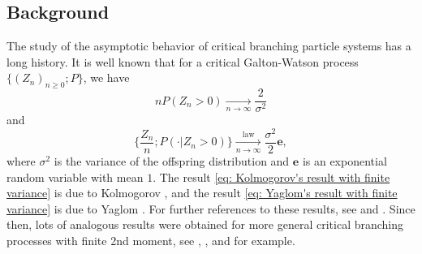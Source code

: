 \documentclass[12pt, a4paper]{amsart}
\theoremstyle{definition}
\numberwithin{equation}{section}
\begin{document}
\subsection{Background}
    The study of the asymptotic behavior of critical branching particle systems has a long history.
	It is well known that for a critical Galton-Watson
    process $\{(Z_n)_{n\geq 0}; P\}$,	
	we have
	\[\label{eq: Kolmogorov's result with finite variance}
		n P(Z_n > 0)
		\xrightarrow[n\to \infty]{} \frac{2}{\sigma^2}
	\]
	and
	\[\label{eq: Yaglom's result with finite variance}
		\Big\{ \frac{Z_n}{n}; P(\cdot| Z_n > 0) \Big\}
		\xrightarrow[n \to \infty]{\operatorname{law}} \frac{\sigma^2}{2} \mathbf e,
	\]
	where $\sigma^2$ is the variance of the offspring distribution and $\mathbf e$ is an exponential random variable with mean $1$.
	The result \eqref{eq: Kolmogorov's result with finite variance} is due to Kolmogorov \cite{Kolmogorov1938Zur-losung}, and the result \eqref{eq: Yaglom's result with finite variance} is due to Yaglom \cite{Yaglom1947Certain}.
	For further references to these results, see \cite{Harris2002The-theory} and \cite{KestenNeySpitzer1966The-Galton-Watson}.
	Since then, lots of analogous results were obtained for more general critical branching processes with finite 2nd moment, see \cite{AsmussenHering1983Branching}, \cite{AthreyaNey1974Functionals}, \cite{AthreyaNey1972Branching} and \cite{JoffeSpitzer1967On-multitype} for example.
	
\end{document}
